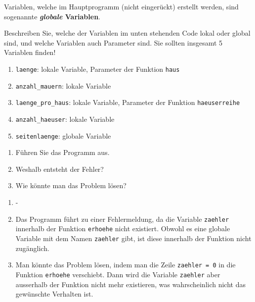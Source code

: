 Variablen, welche im Hauptprogramm (nicht eingerückt) erstellt werden, sind sogenannte \textbf{\textit{globale} Variablen}.

\begin{myexercise}\label{ex:local-global}
	Beschreiben Sie, welche der Variablen im unten stehenden Code lokal oder global sind, und welche Variablen auch Parameter sind. Sie sollten insgesamt 5 Variablen finden!
	

	\begin{myanswer}
		\begin{enumerate}
			\item \lstinline|laenge|: lokale Variable, Parameter der Funktion \lstinline|haus|
			\item \lstinline|anzahl_mauern|: lokale Variable
			\item \lstinline|laenge_pro_haus|: lokale Variable, Parameter der Funktion \lstinline|haeuserreihe|
			\item \lstinline|anzahl_haeuser|: lokale Variable
			\item \lstinline|seitenlaenge|: globale Variable
		\end{enumerate}
	\end{myanswer}
\end{myexercise}

\begin{myexercise}
	
	\begin{enumerate}
		\item Führen Sie das Programm aus.
		\item Weshalb entsteht der Fehler?
		\item Wie könnte man das Problem lösen?
	\end{enumerate}
	\begin{myanswer}
		\begin{enumerate}
			\item -
			\item Das Programm führt zu einer Fehlermeldung, da die Variable \lstinline|zaehler| innerhalb der Funktion \lstinline|erhoehe| nicht existiert. Obwohl es eine globale Variable mit dem Namen \lstinline|zaehler| gibt, ist diese innerhalb der Funktion nicht zugänglich.
			\item Man könnte das Problem lösen, indem man die Zeile \lstinline|zaehler = 0| in die Funktion \lstinline|erhoehe| verschiebt. Dann wird die Variable \lstinline|zaehler| aber ausserhalb der Funktion nicht mehr existieren, was wahrscheinlich nicht das gewünschte Verhalten ist.
		\end{enumerate}
	\end{myanswer}
\end{myexercise}


